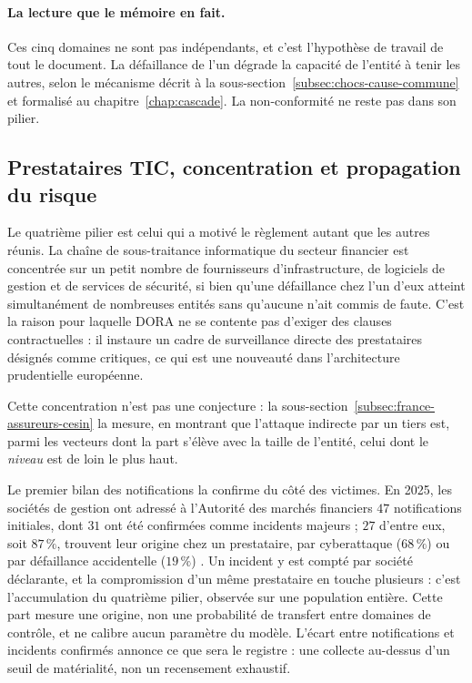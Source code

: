 \paragraph{La lecture que le mémoire en fait.} Ces cinq domaines ne sont pas indépendants, et
c'est l'hypothèse de travail de tout le document. La défaillance de l'un dégrade la capacité de
l'entité à tenir les autres, selon le mécanisme décrit à la
sous-section~\ref{subsec:chocs-cause-commune} et formalisé au chapitre~\ref{chap:cascade}. La
non-conformité ne reste pas dans son pilier.

\subsection{Prestataires TIC, concentration et propagation du risque}
\label{subsec:risque-tiers-dora}

Le quatrième pilier est celui qui a motivé le règlement autant que les autres réunis. La chaîne
de sous-traitance informatique du secteur financier est concentrée sur un petit nombre de
fournisseurs d'infrastructure, de logiciels de gestion et de services de sécurité, si bien qu'une
défaillance chez l'un d'eux atteint simultanément de nombreuses entités sans qu'aucune n'ait
commis de faute. C'est la raison pour laquelle DORA ne se contente pas d'exiger des clauses
contractuelles : il instaure un cadre de surveillance directe des prestataires désignés comme
critiques, ce qui est une nouveauté dans l'architecture prudentielle européenne.

Cette concentration n'est pas une conjecture : la sous-section~\ref{subsec:france-assureurs-cesin}
la mesure, en montrant que l'attaque indirecte par un tiers est, parmi les vecteurs dont la part
s'élève avec la taille de l'entité, celui dont le \emph{niveau} est de loin le plus haut.

Le premier bilan des notifications la confirme du côté des victimes. En
2025, les sociétés de gestion ont adressé à l'Autorité des marchés financiers $47$
notifications initiales, dont $31$ ont été confirmées comme incidents majeurs ; $27$ d'entre
eux, soit $87\,\%$, trouvent leur origine chez un prestataire, par cyberattaque ($68\,\%$) ou
par défaillance accidentelle ($19\,\%$) \citep{amf2026incidents}. Un incident y est compté par
société déclarante, et la compromission d'un même prestataire en touche plusieurs : c'est
l'accumulation du quatrième pilier, observée sur une population entière. Cette part mesure une
origine, non une probabilité de transfert entre domaines de contrôle, et ne calibre aucun
paramètre du modèle. L'écart entre notifications et incidents confirmés annonce ce que
sera le registre : une collecte au-dessus d'un seuil de matérialité, non un recensement
exhaustif.

